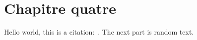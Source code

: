 \chapter{Chapitre quatre}
\label{chap:c4}

Hello world, this is a citation:~\cite{Guyton:1956:TextbookPhysiology}.
The next part is random text.

\lipsum


\printbibliography[heading=subbibliography]

